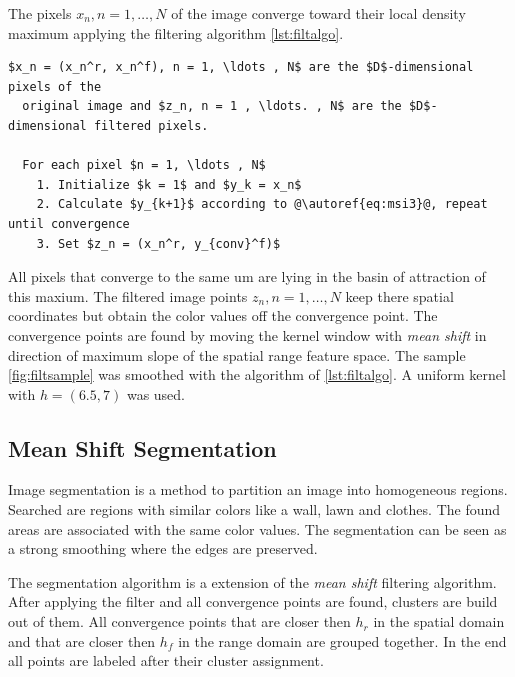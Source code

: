 The pixels $x_n, n = 1, \ldots, N$ of the image converge toward their local density
maximum applying the filtering algorithm \autoref{lst:filtalgo}. \\

\begin{lstlisting}[caption=Mean shift filtering, label=lst:filtalgo, mathescape, numbers=none, escapechar=@, keywordstyle=\color{black}]
  $x_n = (x_n^r, x_n^f), n = 1, \ldots , N$ are the $D$-dimensional pixels of the
  original image and $z_n, n = 1 , \ldots. , N$ are the $D$-dimensional filtered pixels.

  For each pixel $n = 1, \ldots , N$
    1. Initialize $k = 1$ and $y_k = x_n$
    2. Calculate $y_{k+1}$ according to @\autoref{eq:msi3}@, repeat until convergence
    3. Set $z_n = (x_n^r, y_{conv}^f)$ 
\end{lstlisting}

All pixels that converge to the same um are lying in the basin of attraction
of this maxium. The filtered image points $z_n, n = 1 , \ldots , N$ keep there
spatial coordinates but obtain the color values off the convergence point. The
convergence points are found by moving the kernel window with \emph{mean shift} 
in direction of maximum slope of the spatial range feature space. The sample
\autoref{fig:filtsample} was smoothed with the algorithm of \autoref{lst:filtalgo}. 
A uniform kernel with $h = (6.5, 7)$ was used.

\subsection{Mean Shift Segmentation} %
\label{sub:mean_shift_segmentation}
Image segmentation is a method to partition an image into homogeneous regions. 
Searched are regions with similar colors like a wall, lawn and clothes. 
The found areas are associated with the same color values. The segmentation 
can be seen as a strong smoothing where the edges are preserved. 

The segmentation algorithm is a extension of the \emph{mean shift } filtering
algorithm. After applying the filter and all convergence points are found,
clusters are build out of them. All convergence points that are closer then
$h_r$ in the spatial domain and that are closer then $h_f$ in the range domain
are grouped together. In the end all points are labeled after their cluster
assignment.

